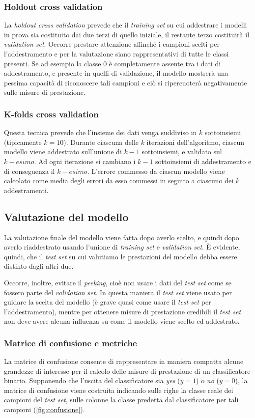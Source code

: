 \subsubsection{Holdout cross validation}
La \emph{holdout cross validation} prevede che il \emph{training set } su cui addestrare i modelli in prova sia costituito dai due terzi di quello iniziale, il restante terzo costituirà il \emph{validation set}. Occorre prestare attenzione affinché i campioni scelti per l'addestramento e per la valutazione siano rappresentativi di tutte le classi presenti. Se ad esempio la classe 0 è completamente assente tra i dati di addestramento, e presente in quelli di validazione, il modello mostrerà una pessima capacità di riconoscere tali campioni e ciò si ripercuoterà negativamente sulle misure di prestazione.


\subsubsection{K-folds cross validation}
Questa tecnica prevede che l'insieme dei dati venga suddiviso in $k$ sottoinsiemi (tipicamente $k=10$). Durante ciascuna delle $k$ iterazioni dell'algoritmo, ciascun modello viene addestrato sull'unione di $k-1$ sottoinsiemi, e validato sul $k-esimo$. Ad ogni iterazione si cambiano i $k-1$ sottoinsiemi di addestramento e di conseguenza il $k-esimo$. L'errore commesso da ciascun modello viene calcolato come media degli errori da esso commessi in seguito a ciascuno dei $k$ addestramenti.

\subsection{Valutazione del modello}
La valutazione finale del modello viene fatta dopo averlo scelto, e quindi dopo averlo riaddestrato usando l'unione di \emph{training set} e \emph{validation set}. È evidente, quindi, che il \emph{test set} su cui valutiamo le prestazioni del modello debba essere distinto dagli altri due.

Occorre, inoltre, evitare il \emph{peeking}, cioè non usare i dati del \emph{test set} come se fossero parte del \emph{validation set}. In questa maniera il \emph{test set} viene usato per guidare la scelta del modello (è grave quasi come usare il \emph{test set} per l'addestramento), mentre per ottenere misure di prestazione credibili il \emph{test set} non deve avere alcuna influenza su come il modello viene scelto ed addestrato.


\subsubsection{Matrice di confusione e metriche}
La matrice di confusione consente di rappresentare in maniera compatta alcune grandezze di interesse per il calcolo delle misure di prestazione di un classificatore binario. Supponendo che l'uscita del classificatore sia \emph{yes} ($y=1$) o \emph{no} ($y=0$), la matrice di confusione viene costruita indicando sulle righe la classe reale dei campioni del \emph{test set}, sulle colonne la classe predetta dal classificatore per tali campioni (\autoref{fig:confusione}).



